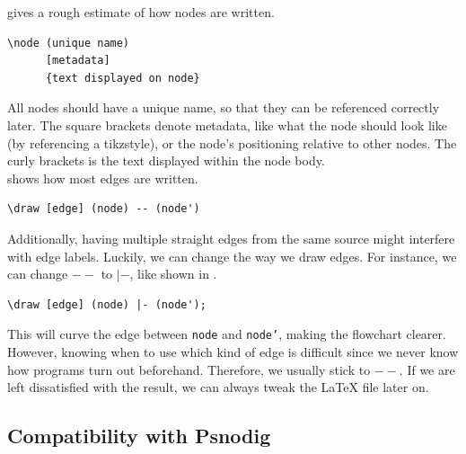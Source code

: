 gives a rough estimate of how nodes are written. \\

\begin{lstlisting}[caption={How nodes are written with TikZ.}, captionpos=b, label={How nodes are written with TikZ.}]
\node (unique name)
      [metadata]
      {text displayed on node}
\end{lstlisting}

All nodes should have a unique name, so that they can be referenced correctly later. The square brackets denote metadata, like what the node should look like (by referencing a tikzstyle), or the node's positioning relative to other nodes. The curly brackets is the text displayed within the node body. \\

 shows how most edges are written. \\

\begin{lstlisting}[caption={How edges are written with TikZ.}, captionpos=b, label={How edges are written with TikZ.}]
\draw [edge] (node) -- (node')
\end{lstlisting}


Additionally, having multiple straight edges from the same source might interfere with edge labels. Luckily, we can change the way we draw edges. For instance, we can change \texttt{$--$} to \texttt{$|-$}, like shown in . \\

\begin{lstlisting}[caption={Alternative way of writing an edge.}, captionpos=b, label={Alternative way of writing an edge.}]
\draw [edge] (node) |- (node');
\end{lstlisting}

This will curve the edge between \texttt{node} and \texttt{node'}, making the flowchart clearer. However, knowing when to use which kind of edge is difficult since we never know how programs turn out beforehand. Therefore, we usually stick to \texttt{$--$}. If we are left dissatisfied with the result, we can always tweak the LaTeX file later on.

\subsection{Compatibility with Psnodig}

